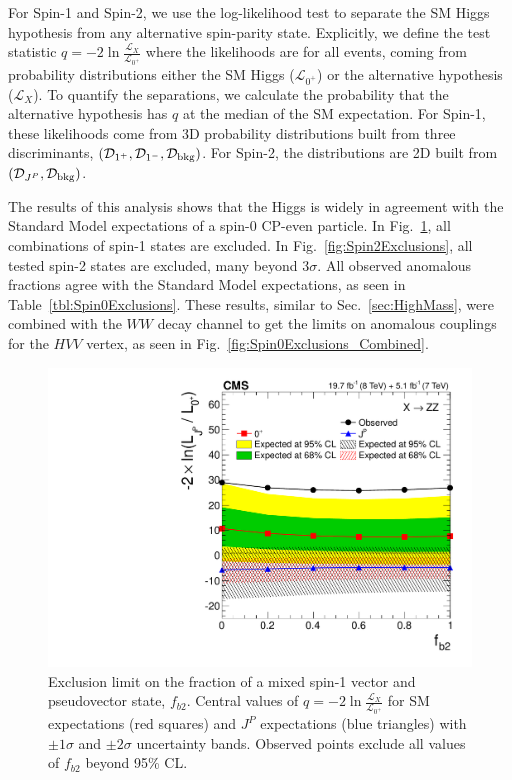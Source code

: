 For Spin-1 and Spin-2, we use the log-likelihood test to separate the SM Higgs hypothesis from any alternative spin-parity state. Explicitly, we define the test statistic $q = -2 \ln \frac{\mathcal{L}_X}{\mathcal{L}_{0^+}}$ where the likelihoods are for all events, coming from probability distributions either the SM Higgs ($\mathcal{L}_{0^+}$) or the alternative hypothesis ($\mathcal{L}_{X}$). To quantify the separations, we calculate the probability that the alternative hypothesis has $q$ at the median of the SM expectation. For Spin-1, these likelihoods come from 3D probability distributions built from three discriminants, $({\mathcal{D}}_{1^+},{\mathcal{D}}_{1^-},{\mathcal{D}}_{\rm bkg})$. For Spin-2, the distributions are 2D built from $({\mathcal{D}}_{J^P},{\mathcal{D}}_{\rm bkg})$.

The results of this analysis shows that the Higgs is widely in agreement with the Standard Model expectations of a spin-0 CP-even particle. In Fig.~\ref{fig:Spin1Exclusions}, all combinations of spin-1 states are excluded. In Fig.~\ref{fig:Spin2Exclusions}, all tested spin-2 states are excluded, many beyond $3\sigma$. All observed anomalous fractions agree with the Standard Model expectations, as seen in Table~\ref{tbl:Spin0Exclusions}. These results, similar to Sec.~\ref{sec:HighMass}, were combined \cite{} with the $WW$ decay channel to get the limits on anomalous couplings for the $HVV$ vertex, as seen in Fig.~\ref{fig:Spin0Exclusions_Combined}.

\begin{figure}[htbp]
\begin{center}
\includegraphics[width=.6\linewidth]{HiggsProperties/figures/summary_PI.pdf}
\caption[Exclusion Limits on Mixed Spin-1 State in $4l$ for $125.6$ $\rm{GeV}$ Higgs Boson]{Exclusion limit on the fraction of a mixed spin-1 vector and pseudovector state, $f_{b2}$. Central values of $q = -2 \ln \frac{\mathcal{L}_X}{\mathcal{L}_{0^+}}$ for SM expectations (red squares) and $J^P$ expectations (blue triangles) with $\pm1\sigma$ and $\pm2\sigma$ uncertainty bands. Observed points exclude all values of $f_{b2}$ beyond 95\% CL.}
\label{fig:Spin1Exclusions}
\end{center}
\end{figure}


